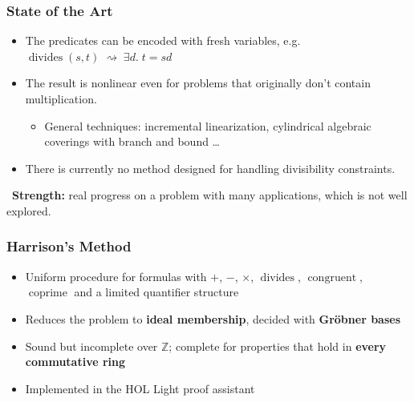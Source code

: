 \documentclass[usepdftitle=false,aspectratio=169,usenames,dvipsnames]{beamer}
\newcommand{\bluecheck}{{\color{blue}\checkmark}}
\newcommand\vitem{\vfill\item}
\newcommand\pvitem{\pause\vfill\item}
\newcommand{\coprime}{\operatorname{coprime}}
\newcommand{\divides}{\operatorname{divides}}
\newcommand{\congruent}{\operatorname{congruent}}
\newcommand{\strength}[1]{\begin{strengthbox}\small\bluecheck\ \textbf{Strength:} #1\end{strengthbox}}
\begin{document}
\begin{frame}
  \frametitle{State of the Art}
  \begin{itemize}
    \item The predicates can be encoded with fresh variables, e.g.\ $\divides(s, t) \;\rightsquigarrow\; \exists d.\; t = sd$
    \pvitem The result is nonlinear even for problems that originally don't contain multiplication.
      \begin{itemize}
        \item General techniques: incremental linearization, cylindrical algebraic coverings with branch and bound \ldots
      \end{itemize}
    \pvitem There is currently no method designed for handling divisibility constraints.
  \end{itemize}
  \pause
  \vfill
  \strength{real progress on a problem with many applications, which is not well explored.}
\end{frame}

\begin{frame}
  \frametitle{Harrison's Method}
  \begin{itemize}
    \item Uniform procedure for formulas with $+$, $-$, $\times$, $\divides$, $\congruent$, $\coprime$ and a limited quantifier structure
    \vitem Reduces the problem to \textbf{ideal membership}, decided with \textbf{Gr\"obner bases}
    \vitem Sound but incomplete over $\mathbb{Z}$; complete for properties that hold in \textbf{every commutative ring}
    \vitem Implemented in the HOL Light proof assistant
  \end{itemize}
  \vfill
  \centering
\end{frame}
\end{document}
